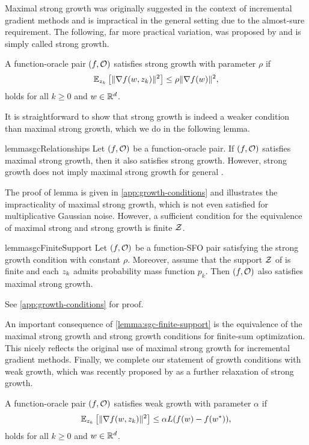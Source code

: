 Maximal strong growth was originally suggested in the context of incremental gradient methods and is impractical in the general setting due to the almost-sure requirement.
The following, far more practical variation, was proposed by \citet{vaswani2019fast} and is simply called strong growth.
\begin{definition}\label{def:sgc}
    A function-oracle pair \( \rbr{f, \oracle{}} \) satisfies strong growth with parameter \(\rho \) if
    \[ \Ek \sbr{\norm{\grad(\w, \zk)}^2} \leq \rho \norm{\grad(\w)}^2, \]
    holds for all \( k \geq 0 \) and \( \w \in \R^d \).
\end{definition}
\noindent It is straightforward to show that strong growth is indeed a weaker condition than maximal strong growth, which we do in the following lemma.
\begin{restatable}{lemma}{sgcRelationships}\label{thm:sgc-relationships}
    Let \( \rbr{f, \oracle{}} \) be a function-oracle pair. 
    If \( \rbr{f, \oracle{}} \) satisfies maximal strong growth, then it also satisfies strong growth.
    However, strong growth does not imply maximal strong growth for general \oracle{}.  
\end{restatable} 
\noindent The proof of lemma is given in \autoref{app:growth-conditions} and illustrates the impracticality of maximal strong growth, which is not even satisfied for multiplicative Gaussian noise.
However, a sufficient condition for the equivalence of maximal strong and strong growth is finite \( \calZ \).
\begin{restatable}{lemma}{sgcFiniteSupport}\label{lemma:sgc-finite-support}
    Let \( \rbr{f, \oracle{}} \) be a function-\ac{SFO} pair satisfying the strong growth condition with constant \( \rho \).
    Moreover, assume that the support \( \calZ \) of \oracle{} is finite and each \( \zk \) admits probability mass function \( p_k \). 
    Then \( \rbr{f, \oracle{}} \) also satisfies maximal strong growth.
\end{restatable}
\noindent See \autoref{app:growth-conditions} for proof.\hfill \break

An important consequence of \autoref{lemma:sgc-finite-support} is the equivalence of the maximal strong growth and strong growth conditions for finite-sum optimization.
This nicely reflects the original use of maximal strong growth for incremental gradient methods. 
Finally, we complete our statement of growth conditions with weak growth, which was recently proposed by \citet{vaswani2019fast} as a further relaxation of strong growth.
\begin{definition}\label{def:wgc}
    A function-oracle pair \( \rbr{f, \oracle{}} \) satisfies weak growth with parameter \(\alpha \) if
    \[ \Ek \sbr{\norm{\grad(\w, \zk)}^2} \leq \alpha L (f(\w) - f(\wopt)), \]
    holds for all \( k \geq 0 \) and \( \w \in \R^d\).
\end{definition}


